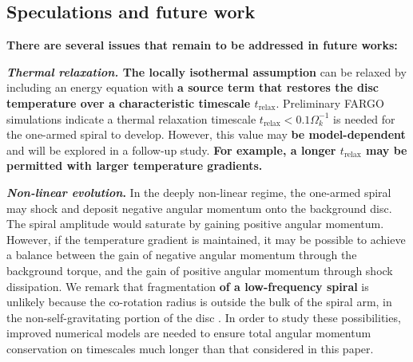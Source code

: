 \subsection{Speculations and future work}

{\bf There are several issues that remain to be addressed in future
  works:} 

{\bf \emph{Thermal relaxation.} The locally isothermal assumption 
} can be relaxed by including an energy equation with
{\bf a source term that restores the disc temperature over a
  characteristic timescale $t_\mathrm{relax}$}. Preliminary FARGO
simulations indicate a thermal relaxation timescale $t_\mathrm{relax} <
0.1\Omega_k^{-1}$ is needed for the one-armed spiral to
develop. However, this value may {\bf be model-dependent} and will be
explored in a follow-up study. {\bf For example,
a longer $t_\mathrm{relax}$ may be permitted with larger temperature
gradients.} 



{\bf \emph{Non-linear evolution}.} In the deeply non-linear regime, the
one-armed spiral may  
shock and deposit negative angular momentum onto 
the background disc. The spiral amplitude would saturate by gaining
positive angular momentum. However, if the temperature gradient is
maintained, it may be possible to achieve a balance between the gain
of negative angular momentum through the background torque, and the
gain of positive angular momentum through shock dissipation. We remark  
that fragmentation {\bf of a low-frequency spiral} is unlikely
because the co-rotation radius is outside the bulk of the spiral arm, in the non-self-gravitating
portion of the disc \citep{durisen08}. In order
to study these possibilities, improved numerical models are needed to
ensure total angular momentum conservation on timescales much longer
than that considered in this paper. 





